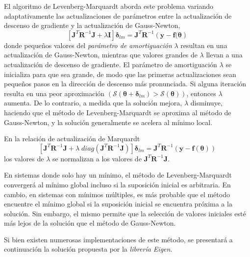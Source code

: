 El algoritmo de Levenberg-Marquardt aborda este problema variando adaptativamente las actualizaciones de parámetros entre la actualización de descenso de gradiente y la actualización de Gauss-Newton,
\begin{equation}
    \left[\bm{J}^T\bm{R}^{-1}\bm{J} + \lambda\bm{I}\right]\bm{\delta}_{lm} = \bm{J}^T\bm{R}^{-1}\left(\bm{y} - \bm{f}(\bm{\theta}\right)
\end{equation}{}
donde pequeños valores del \textit{parámetro de amortiguación} $\lambda$ resultan en una actualización de Gauss-Newton, mientras que valores grandes de $\lambda$ llevan a una actualización de descenso de gradiente. El parámetro de amortiguación $\lambda$ se inicializa para que sea grande, de modo que las primeras actualizaciones sean pequeños pasos en la dirección de descenso más pronunciada. Si alguna iteración resulta en una peor aproximación $(\mathscr{S}(\bm{\theta} + \bm{\delta}_{lm}) > \mathscr{S}({\bm{\theta}}))$, entonces $\lambda$ aumenta. De lo contrario, a medida que la solución mejora, $\lambda$ disminuye, haciendo que el método de Levenberg-Marquardt se aproxima al método de Gauss-Newton, y la solución generalmente se acelera al mínimo local.

En la relación de actualización de Marquardt
\begin{equation}
    \left[\bm{J}^T\bm{R}^{-1}\bm{J} + \lambda\;  diag(\bm{J}^T\bm{R}^{-1}\bm{J})\right]\bm{\delta}_{lm} = \bm{J}^T\bm{R}^{-1}\left(\bm{y} - \bm{f}(\bm{\theta})\right)
\end{equation}{}
los valores de $\lambda$ se normalizan a los valores de $\bm{J}^T\bm{R}^{-1}\bm{J}$.

En sistemas donde solo hay un mínimo, el método de Levenberg-Marquardt convergerá al mínimo global incluso si la suposición inicial es arbitraria. En cambio, en sistemas con mínimos múltiples, es más probable que el método encuentre el mínimo global si la suposición inicial se encuentra próxima a la solución. Sin embargo, el mismo permite que la selección de valores iniciales esté más lejos de la solución que el método de Gauss-Newton.

Si bien existen numerosas implementaciones de este método, se presentará a continuación la solución propuesta por la \textit{librería Eigen}.

